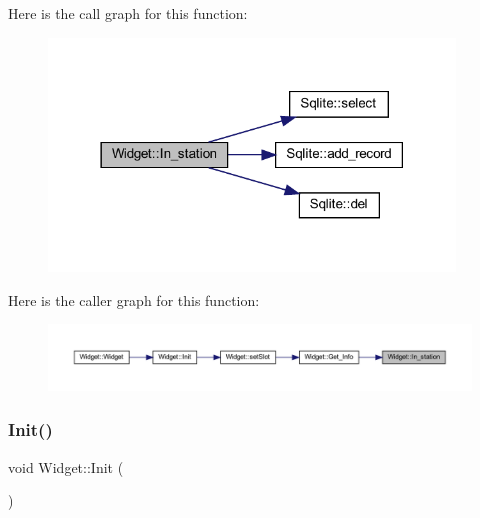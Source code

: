 Here is the call graph for this function\+:
\nopagebreak
\begin{figure}[H]
\begin{center}
\leavevmode
\includegraphics[width=306pt]{class_widget_a9288c149d01aec945f48b6f064f3c7dd_cgraph}
\end{center}
\end{figure}
Here is the caller graph for this function\+:
\nopagebreak
\begin{figure}[H]
\begin{center}
\leavevmode
\includegraphics[width=350pt]{class_widget_a9288c149d01aec945f48b6f064f3c7dd_icgraph}
\end{center}
\end{figure}
\mbox{\label{class_widget_a3d48db3265c90f9dfa3e2303971690bf}} 
\subsubsection{\texorpdfstring{Init()}{Init()}}
{\footnotesize\ttfamily void Widget\+::\+Init (\begin{DoxyParamCaption}{ }\end{DoxyParamCaption})}


